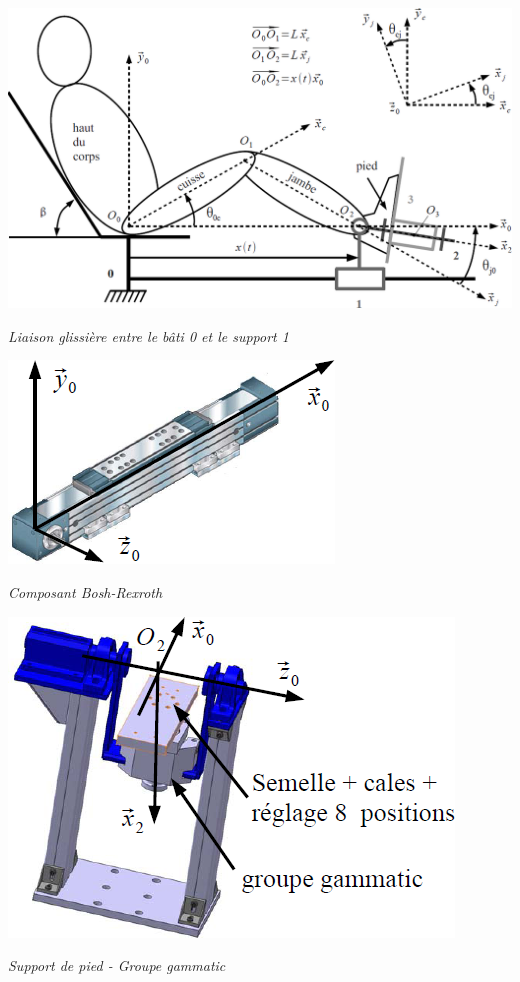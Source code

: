 \documentclass[10pt]{article}
\begin{document}
 

\begin{center}
\includegraphics[width=.8\textwidth]{images/schema}

\textit{Liaison glissière entre le bâti 0 et le support 1}
\end{center}
 	 


\begin{minipage}[c]{.48\linewidth}
\begin{center}
\includegraphics[width=.8\textwidth]{images/glissiere}

\textit{Composant Bosh-Rexroth}
\end{center}
\end{minipage} \hfill
\begin{minipage}[c]{.48\linewidth}
\begin{center}
\includegraphics[width=.8\textwidth]{images/support}

\textit{Support de pied  - Groupe gammatic}
\end{center}
\end{minipage}
	
\end{document}
